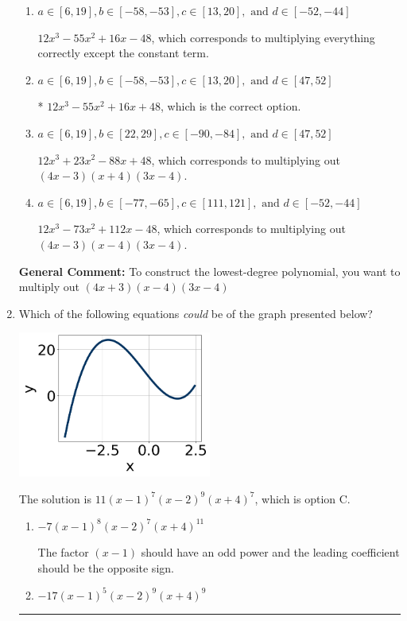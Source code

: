 \documentclass{extbook}[14pt]
\newcommand{\litem}[1]{\item #1

\rule{\textwidth}{0.4pt}}
\begin{document}
\begin{enumerate}
{\begin{enumerate}[label=\Alph*.]
$12x^{3} +55 x^{2} +16 x -48$, which corresponds to multiplying out $(4x -3)(x + 4)(3x + 4)$.
\item \( a \in [6, 19], b \in [-58, -53], c \in [13, 20], \text{ and } d \in [-52, -44] \)

$12x^{3} -55 x^{2} +16 x -48$, which corresponds to multiplying everything correctly except the constant term.
\item \( a \in [6, 19], b \in [-58, -53], c \in [13, 20], \text{ and } d \in [47, 52] \)

* $12x^{3} -55 x^{2} +16 x + 48$, which is the correct option.
\item \( a \in [6, 19], b \in [22, 29], c \in [-90, -84], \text{ and } d \in [47, 52] \)

$12x^{3} +23 x^{2} -88 x + 48$, which corresponds to multiplying out $(4x -3)(x + 4)(3x -4)$.
\item \( a \in [6, 19], b \in [-77, -65], c \in [111, 121], \text{ and } d \in [-52, -44] \)

$12x^{3} -73 x^{2} +112 x -48$, which corresponds to multiplying out $(4x -3)(x -4)(3x -4)$.
\end{enumerate}

\textbf{General Comment:} To construct the lowest-degree polynomial, you want to multiply out $(4x + 3)(x -4)(3x -4)$
}
\litem{
Which of the following equations \textit{could} be of the graph presented below?

\begin{center}
    \includegraphics[width=0.5\textwidth]{../Figures/polyGraphToFunctionB.png}
\end{center}


The solution is \( 11(x - 1)^{7} (x - 2)^{9} (x + 4)^{7} \), which is option C.\begin{enumerate}[label=\Alph*.]
\item \( -7(x - 1)^{8} (x - 2)^{7} (x + 4)^{11} \)

The factor $(x - 1)$ should have an odd power and the leading coefficient should be the opposite sign.
\item \( -17(x - 1)^{5} (x - 2)^{9} (x + 4)^{9} \)


\end{enumerate}}
\end{enumerate}
\end{document}
